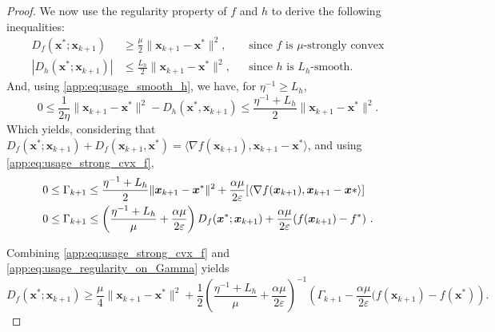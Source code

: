 \documentclass[10pt,a4paper]{amsart}
\def\eps{{\varepsilon}}
\def\vx{{\bm{x}}}
\begin{document}
\begin{proof}
    
    We now use the regularity property of $f$ and $h$ to derive the following inequalities: 
    \begin{align}
        D_{f}(\vx^*;\vx_{k+1}) &\ge \frac{\mu}{2}\|\vx_{k+1}-\vx^*\|^2, &&\text{since $f$ is $\mu$-strongly convex}\label{app:eq:usage_strong_cvx_f}\\
        |D_{h}(\vx^*;\vx_{k+1})| &\le \frac{L_h}{2}\|\vx_{k+1}-\vx^*\|^2,&&\text{since $h$ is $L_h$-smooth. }\label{app:eq:usage_smooth_h}
    \end{align}
    And, using \cref{app:eq:usage_smooth_h}, we have, for $\eta^{-1} \ge L_h$,
    \[
    0 \le \frac{1}{2\eta}\|\vx_{k+1} - \vx^*\|^2 - D_h(\vx^*,\vx_{k+1}) \le \frac{\eta^{-1} + L_h}{2}\|\vx_{k+1} - \vx^*\|^2.
    \]
    Which yields, considering that $D_f(\vx^*;\vx_{k+1}) + D_f(\vx_{k+1},\vx^*)=\langle \nabla f(\vx_{k+1}), \vx_{k+1}-\vx^*\rangle$, and using \cref{app:eq:usage_strong_cvx_f},
    \begin{align}
        0 \le \Gamma_{k+1} &\le \frac{\eta^{-1} + L_h}{2}\|\vx_{k+1} - \vx^*\|^2 + \frac{\alpha \mu}{2 \eps}[\langle \nabla f(\vx_{k+1}), \vx_{k+1}-\vx*\rangle]\notag\\
        0 \le \Gamma_{k+1}&\le \left(\frac{\eta^{-1} + L_h}{\mu} + \frac{\alpha \mu}{2 \eps}\right) D_f(\vx^*;\vx_{k+1}) + \frac{\alpha \mu}{2 \eps}(f(\vx_{k+1}) - f^*)\label{app:eq:usage_regularity_on_Gamma} \ .
    \end{align}
    
Combining \cref{app:eq:usage_strong_cvx_f} and \cref{app:eq:usage_regularity_on_Gamma} yields
\begin{equation}
\label{app:eq:lowerbound_Df}
D_f(\vx^*;\vx_{k+1}) \ge  \frac{\mu}{4}\|\vx_{k+1}-\vx^*\|^2 +\frac{1}{2}\left(\frac{\eta^{-1} + L_h}{\mu} + \frac{\alpha \mu}{2 \eps}\right)^{-1}  \left(\Gamma_{k+1} - \frac{\alpha \mu}{2 \eps} (f(\vx_{k+1})-f(\vx^*)\right).
\end{equation}


\end{proof}
\end{document}
